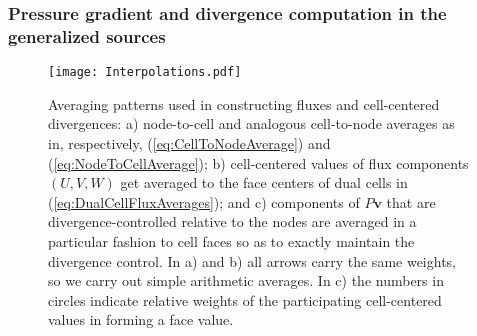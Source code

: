 \documentclass[12pt,a4paper]{article}
\theoremstyle{definition}
\newcommand{\eq}[1]{(\ref{#1})}
\newcommand{\vect}[1]{{\mathbf{#1}}}
\newcommand{\vv}{\vect{v}}
\begin{document}

\subsubsection{Pressure gradient and divergence computation in the generalized sources}
\label{sssec:NodalDiscretization}


\begin{figure}
\centering
 \texttt{[image: Interpolations.pdf]}
 \caption{Averaging patterns used in constructing fluxes and cell-centered divergences: 
 a) node-to-cell and analogous cell-to-node averages as in, respectively, \eq{eq:CellToNodeAverage} and 
 \eq{eq:NodeToCellAverage}; 
 b) cell-centered values of flux components $(U,V,W)$ get averaged to the face centers 
 of dual cells in \eq{eq:DualCellFluxAverages}; 
 and c) components 
 of $P\vv$ that are divergence-controlled relative to the nodes are averaged in a 
 particular fashion to cell faces so as to exactly maintain the divergence control. In a) 
 and b) all arrows carry the same weights, so we carry out simple arithmetic averages. In
 c) the numbers in circles indicate relative weights of the participating cell-centered
 values in forming a face value.}
 \label{fig:Interpolations}
\end{figure}
\end{document}

